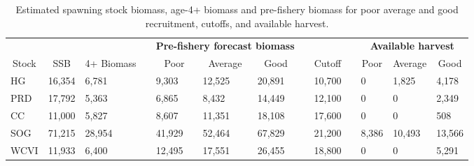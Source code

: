 %
\begin{table}[!tbp]
 \small
 \caption{Estimated spawning stock biomass,  age-4+ biomass and pre-fishery
			biomass for poor average and good recruitment,  cutoffs,  and 
			available harvest.\label{TableCatchAdvice}} 
 \begin{center}
 \begin{tabular}{lllclllclclll}\hline\hline
\multicolumn{3}{c}{\bfseries }&
\multicolumn{1}{c}{\bfseries }&
\multicolumn{3}{c}{\bfseries Pre-fishery forecast biomass}&
\multicolumn{1}{c}{\bfseries }&
\multicolumn{1}{c}{\bfseries }&
\multicolumn{1}{c}{\bfseries }&
\multicolumn{3}{c}{\bfseries Available harvest}
\tabularnewline \cline{1-13}
\multicolumn{1}{c}{Stock}&\multicolumn{1}{c}{SSB}&\multicolumn{1}{c}{4+ Biomass}&\multicolumn{1}{c}{}&\multicolumn{1}{c}{Poor}&\multicolumn{1}{c}{Average}&\multicolumn{1}{c}{Good}&\multicolumn{1}{c}{}&\multicolumn{1}{c}{Cutoff}&\multicolumn{1}{c}{}&\multicolumn{1}{c}{Poor}&\multicolumn{1}{c}{Average}&\multicolumn{1}{c}{Good}\tabularnewline
\hline
HG&16,354& 6,781&& 9,303&12,525&20,891&&10,700&&     0& 1,825& 4,178\tabularnewline
PRD&17,792& 5,363&& 6,865& 8,432&14,449&&12,100&&     0&     0& 2,349\tabularnewline
CC&11,000& 5,827&& 8,607&11,351&18,108&&17,600&&     0&     0&   508\tabularnewline
SOG&71,215&28,954&&41,929&52,464&67,829&&21,200&& 8,386&10,493&13,566\tabularnewline
WCVI&11,933& 6,400&&12,495&17,551&26,455&&18,800&&     0&     0& 5,291\tabularnewline
\hline
\end{tabular}

\end{center}

\end{table}

